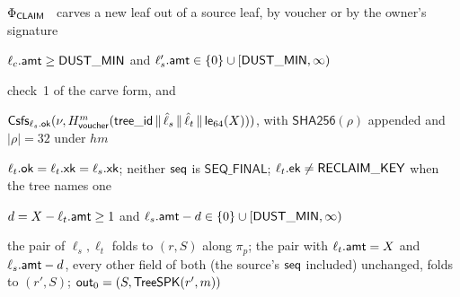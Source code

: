 {\begin{predbox}{$\Phi_{\textsf{CLAIM}}$ \textendash\ carves a new leaf out of a source leaf, by voucher or by the owner's signature}
\begin{checks}
\item $\ell_c.\mathsf{amt} \ge \mathsf{DUST\_MIN}$ and $\ell_s'.\mathsf{amt} \in \{0\} \cup [\mathsf{DUST\_MIN}, \infty)$
\end{checks}
 check~1 of the carve form, and
\begin{checks}
\setcounter{chk}{8}
\item $\mathsf{Csfs}_{\ell_s.\mathsf{ok}}(\nu,H^{m}_{\mathsf{voucher}}(\mathsf{tree\_id} \,\|\, \hat\ell_s \,\|\, \hat\ell_t \,\|\, \mathsf{le}_{64}(X)))$, with $\mathsf{SHA256}(\rho)$ appended and $|\rho| = 32$ under $hm$
\item $\ell_t.\mathsf{ok} = \ell_t.\mathsf{xk} = \ell_s.\mathsf{xk}$; neither $\mathsf{seq}$ is $\mathsf{SEQ\_FINAL}$; $\ell_t.\mathsf{ek} \ne \mathsf{RECLAIM\_KEY}$ when the tree names one
\item $d = X - \ell_t.\mathsf{amt} \ge 1$ and $\ell_s.\mathsf{amt} - d \in \{0\} \cup [\mathsf{DUST\_MIN}, \infty)$
\item the pair of $\ell_s, \ell_t$ folds to $(r, S)$ along $\pi_p$; the pair with $\ell_t.\mathsf{amt} = X$ and $\ell_s.\mathsf{amt} - d$, every other field of both (the source's $\mathsf{seq}$ included) unchanged, folds to $(r', S)$; $\mathsf{out}_0 = (S, \mathsf{TreeSPK}(r', m))$
\end{checks}
\end{predbox}
}

